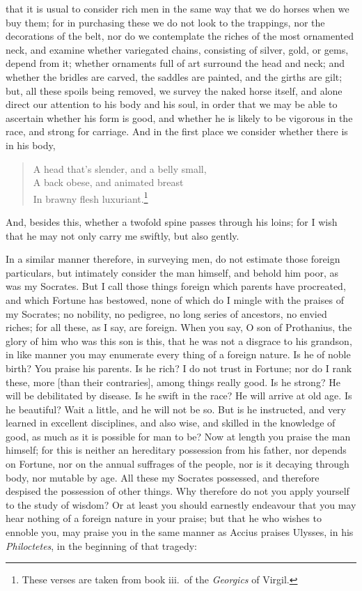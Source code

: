 \documentclass{article}
\begin{document}
that it is usual to consider rich men in the same
way that we do horses when we buy them; for in purchasing
these we do not look to the trappings, nor the
decorations of the belt, nor do we contemplate the riches
of the most ornamented neck, and examine whether
variegated chains, consisting of silver, gold, or gems,
depend from it; whether ornaments full of art surround
the head and neck; and whether the bridles are carved,
the saddles are painted, and the girths are gilt; but, all
these spoils being removed, we survey the naked horse
itself, and alone direct our attention to his body and his
soul, in order that we may be able to ascertain whether
his form is good, and whether he is likely to be vigorous
in the race, and strong for carriage. And in the first
place we consider whether there is in his body,

\begin{verse}
A head that's slender, and a belly small,\\
A back obese, and animated breast\\
In brawny flesh luxuriant.\footnote{These verses are taken from book iii.~of
the \textit{Georgics} of Virgil.}
\end{verse}

\noindent And, besides this, whether a twofold spine passes through his loins;
for I wish that he may not only carry me swiftly, but also gently.

In a similar manner therefore, in surveying men, do not estimate those foreign
particulars, but intimately consider the man himself, and behold him poor, as
was my Socrates. But I call those things foreign which parents have procreated,
and which Fortune has bestowed, none of which do I mingle with the praises of
my Socrates; no nobility, no pedigree, no long series of ancestors, no envied
riches; for all these, as I say, are foreign. When you say, O son of
Prothanius, the glory of him who was this son is this, that he was not a
disgrace to his grandson, in like manner you may enumerate every thing of a
foreign nature. Is he of noble birth? You praise his parents. Is he rich? I do
not trust in Fortune; nor do I rank these, more [than their contraries], among
things really good. Is he strong? He will be debilitated by disease. Is he
swift in the race? He will arrive at old age. Is he beautiful? Wait a little,
and he will not be so. But is he instructed, and very learned in excellent
disciplines, and also wise, and skilled in the knowledge of good, as much as it
is possible for man to be? Now at length you praise the man himself; for this
is neither an hereditary possession from his father, nor depends on Fortune,
nor on the annual suffrages of the people, nor is it decaying through body, nor
mutable by age. All these my Socrates possessed, and therefore despised the
possession of other things. Why therefore do not you apply yourself to the
study of wisdom? Or at least you should earnestly endeavour that you may hear
nothing of a foreign nature in your praise; but that he who wishes to ennoble
you, may praise you in the same manner as Accius praises Ulysses, in his
\textit{Philoctetes}, in the beginning of that tragedy:
\end{document}
